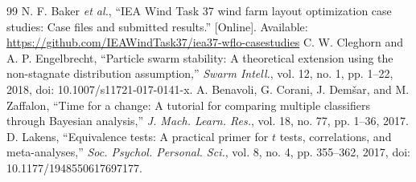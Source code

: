 \documentclass[10pt]{article}
\begin{document}
\begin{thebibliography}{99}
 N. F. Baker \textit{et al.}, ``IEA Wind Task 37 wind farm layout optimization case studies: Case files and submitted results.'' [Online]. Available: \url{https://github.com/IEAWindTask37/iea37-wflo-casestudies}
C. W. Cleghorn and A. P. Engelbrecht, ``Particle swarm stability: A theoretical extension using the non-stagnate distribution assumption,'' \textit{Swarm Intell.}, vol. 12, no. 1, pp. 1--22, 2018, doi: 10.1007/s11721-017-0141-x.
A. Benavoli, G. Corani, J. Dem\v{s}ar, and M. Zaffalon, ``Time for a change: A tutorial for comparing multiple classifiers through Bayesian analysis,'' \textit{J. Mach. Learn. Res.}, vol. 18, no. 77, pp. 1--36, 2017.
D. Lakens, ``Equivalence tests: A practical primer for $t$ tests, correlations, and meta-analyses,'' \textit{Soc. Psychol. Personal. Sci.}, vol. 8, no. 4, pp. 355--362, 2017, doi: 10.1177/1948550617697177.
\end{thebibliography}
\end{document}
